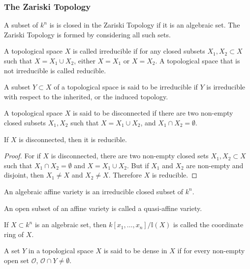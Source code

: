 \documentclass[crop=false,class=book,oneside]{standalone}
\begin{document}
\subsubsection{The Zariski Topology}
\begin{definition}
A subset of $k^n$ is is closed in the Zariski Topology if it is an algebraic set. The Zariski Topology is formed by considering all such sets.
\end{definition}
\begin{definition}
A topological space $X$ is called irreducible if for any closed subsets $X_1,X_2\subset X$ such that $X=X_1\cup X_2$, either $X=X_1$ or $X=X_2$. A topological space that is not irreducible is called reducible.
\end{definition}
\begin{definition}
A subset $Y\subset X$ of a topological space is said to be irreducible if $Y$ is irreducible with respect to the inherited, or the induced topology.
\end{definition}
\begin{definition}
A topological space $X$ is said to be disconnected if there are two non-empty closed subsets $X_1,X_2$ such that $X = X_1\cup X_2$, and $X_1\cap X_2 = \emptyset$.
\end{definition}
\begin{theorem}
If $X$ is disconnected, then it is reducible.
\end{theorem}
\begin{proof}
For if $X$ is disconnected, there are two non-empty closed sets $X_1,X_2\subset X$ such that $X_1\cap X_2 = \emptyset$ and $X = X_1\cup X_2$. But if $X_1$ and $X_2$ are non-empty and disjoint, then $X_1\ne X$ and $X_2 \ne X$. Therefore $X$ is reducible.
\end{proof}
\begin{definition}
An algebraic affine variety is an irreducible closed subset of $k^n$.
\end{definition}
\begin{definition}
An open subset of an affine variety is called a quasi-affine variety.
\end{definition}
\begin{definition}
If $X\subset k^n$ is an algebraic set, then $k[x_1,\hdots ,x_n]/\mathbb{I}(X)$ is called the coordinate ring of $X$.
\end{definition}
\begin{definition}
A set $Y$ in a topological space $X$ is said to be dense in $X$ if for every non-empty open set $\mathcal{O}$, $\mathcal{O}\cap Y\ne \emptyset$.
\end{definition}
\end{document}
